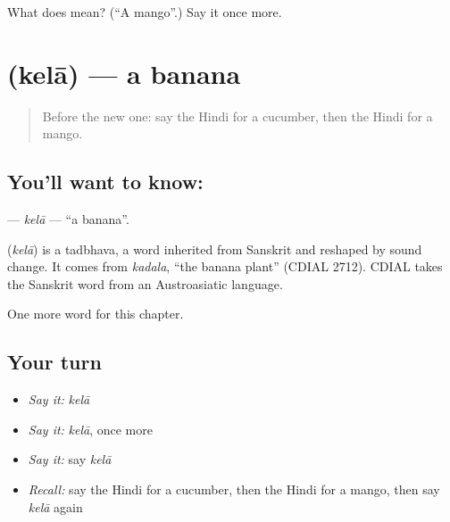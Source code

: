 \begin{tcolorbox}[breakable,colback=teal!4,colframe=teal!35!black,title={Before you move on}]
What does  mean? (\textquotedblleft{}A mango\textquotedblright{}.) Say it once more.
\end{tcolorbox}
\section[\texorpdfstring{\hi{केला} (kelā)}{केला (kelā)}]{ (kelā) — a banana}

\label{lesson:HI-C139-kela}



\begin{quote}
Before the new one: say the Hindi for a cucumber, then the Hindi for a mango.
\end{quote}

\subsection*{You'll want to know: }
\textbf{} — \emph{kelā} — \textquotedblleft{}a banana\textquotedblright{}.

\begin{cousinweb}
\textbf{} (\emph{kelā}) is a tadbhava, a word inherited from Sanskrit and reshaped by sound change. It comes from \emph{kadala}, \textquotedblleft{}the banana plant\textquotedblright{} (CDIAL 2712). CDIAL takes the Sanskrit word from an Austroasiatic language.
\end{cousinweb}

\begin{grammarlens}[title={What you've built}]
One more word for this chapter.
\end{grammarlens}

\subsection*{Your turn}
\begin{itemize}
\raggedright
  \item \emph{Say it:} \emph{kelā}
  \item \emph{Say it:} \emph{kelā}, once more
  \item \emph{Say it:} say \emph{kelā}
  \item \emph{Recall:} say the Hindi for a cucumber, then the Hindi for a mango, then say \emph{kelā} again
\end{itemize}

